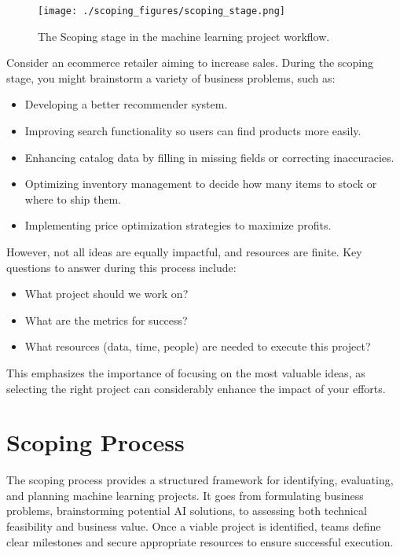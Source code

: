 \documentclass[12pt,openany]{book}
\begin{document}
\begin{figure}[htbp]
    \centering
    \texttt{[image: ./scoping\_figures/scoping\_stage.png]}
    \caption{The Scoping stage in the machine learning project workflow.}
    \label{fig:scoping_stage}
\end{figure}

\begin{examplebox}
Consider an ecommerce retailer aiming to increase sales. During the scoping stage, you might brainstorm a variety of business problems, such as:
\begin{itemize}
    \item Developing a better recommender system.
    \item Improving search functionality so users can find products more easily.
    \item Enhancing catalog data by filling in missing fields or correcting inaccuracies.
    \item Optimizing inventory management to decide how many items to stock or where to ship them.
    \item Implementing price optimization strategies to maximize profits.
\end{itemize}
However, not all ideas are equally impactful, and resources are finite. Key questions to answer during this process include:
\begin{itemize}
    \item What project should we work on?
    \item What are the metrics for success?
    \item What resources (data, time, people) are needed to execute this project?
\end{itemize}
This emphasizes the importance of focusing on the most valuable ideas, as selecting the right project can considerably enhance the impact of your efforts.
\end{examplebox}




\chapter{Scoping Process}

\begin{summarybox}
The scoping process provides a structured framework for identifying, evaluating, and planning machine learning projects. It goes from formulating business problems, brainstorming potential AI solutions, to assessing both technical feasibility and business value. Once a viable project is identified, teams define clear milestones and secure appropriate resources to ensure successful execution. 
\end{summarybox}
\end{document}
